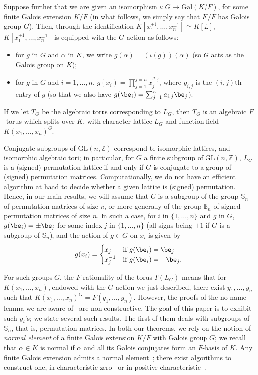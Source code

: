 \documentclass[12pt]{article}
\theoremstyle{plain}
\newcommand{\Z}{\ensuremath{\mathbb{Z}}}
\begin{document}
Suppose further that we are given an isomorphism $\iota: G \to
\mathrm{Gal}(K/F)$, for some finite Galois extension $K/F$ (in what
follows, we simply say that $K/F$ has Galois group $G$). Then, through
the identification $K[x_1^{\pm 1}, \ldots , x_n^{\pm 1}]\simeq K[L]$,
$K[x_1^{\pm 1}, \ldots , x_n^{\pm 1}]$ is equipped with the $G$-action
as follows:
\begin{itemize}
\item for $g$ in $G$ and $\alpha$ in $K$, we write
  $g(\alpha)=(\iota(g))(\alpha)$ (so $G$ acts as the Galois group on
  $K$);
\item for $g$ in $G$ and $i=1,\dots,n$, $g(x_i) = \prod_{j=1}^{j=n}
  x_j^{g_{i,j}}$, where $g_{i,j}$ is the $(i,j)$th -entry of $g$
 (so that we also have $g(\be_i) =
  \sum_{j=1}^{n} a_{i,j}\be_j$).
\end{itemize}
If we let $T_G$ be the algebraic torus corresponding to $L_G$, then
$T_G$ is an algebraic $F$-torus which splits over $K$, with character
lattice $L_G$ and function field $K(x_1,\dots,x_n)^G$.

Conjugate subgroups of $\mathrm{GL}(n,\Z)$ correspond to isomorphic
lattices, and isomorphic algebraic tori; in particular, for $G$ a
finite subgroup of $\mathrm{GL}(n,\mathbb{Z})$, $L_G$ is a (signed)
permutation lattice if and only if $G$ is conjugate to a group of
(signed) permutation matrices.  Computationally, we do not have an
efficient algorithm at hand to decide whether a given lattice is
(signed) permutation. Hence, in our main results, we will assume that
$G$ is a subgroup of the group $\mathbb{S}_n$ of permutation matrices
of size $n$, or more generally of the group $\mathbb{B}_n$ of signed
permutation matrices of size $n$.  In such a case, for $i$ in
$\{1,\dots,n\}$ and $g$ in $G$, $g(\be_i)=\pm \be_j$ for some index
$j$ in $\{1,\dots,n\}$ (all signs being $+1$ if $G$ is a subgroup of
$\mathbb{S}_n$), and the action of $g \in G$ on $x_i$ is given
by $$g(x_i) = \begin{cases} x_j & \text{if~} g(\be_i) = \be_j
  \\ x^{-1}_j & \text{if~} g(\be_i) = -\be_j. \end{cases}$$

For such groups $G$, the $F$-rationality of the torus $T(L_G)$ means
that for $K(x_1,\dots,x_n)$, endowed with the $G$-action we just
described, there exist $y_1,\dots,y_n$ such that
$K(x_1,\dots,x_n)^G=F(y_1,\dots,y_n)$. However, the proofs of the
no-name lemma we are aware of~\cite{xxx} are non constructive.  The
goal of this paper is to exhibit such $y_i$'s; we state several such
results. The first of them deals with subgroups of $\mathbb{S}_n$,
that is, permutation matrices. In both our theorems, we rely on the
notion of {\em normal element} of a finite Galois extension $K/F$ with
Galois group $G$; we recall that $\alpha \in K$ is normal if $\alpha$
and all its Galois conjugates form an $F$-basis of $K$.  Any finite
Galois extension admits a normal element~\cite[Theorem 6.13.1]{Lang};
there exist algorithms to construct one, in characteristic
zero~\cite{Girstmair} or in positive
characteristic~\cite{Giesbrecht,Poli}.
\end{document}
